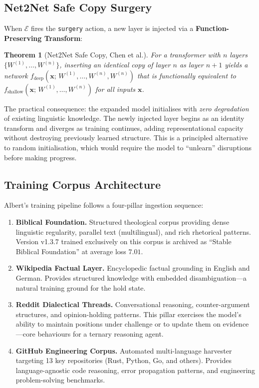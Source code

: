 \documentclass[journal,10pt,twocolumn]{IEEEtran}
\newtheorem{theorem}{Theorem}
\begin{document}
\subsection{Net2Net Safe Copy Surgery}
\label{subsec:net2net}

When $\mathcal{E}$ fires the \texttt{surgery} action, a new layer is injected
via a \textbf{Function-Preserving Transform}:

\begin{theorem}[Net2Net Safe Copy, Chen et al.]
For a transformer with $n$ layers $\{W^{(1)},\ldots,W^{(n)}\}$,
inserting an identical copy of layer $n$ as layer $n+1$ yields a network
$f_\text{deep}(\mathbf{x};\, W^{(1)},\ldots,W^{(n)},W^{(n)})$ that is
functionally equivalent to $f_\text{shallow}(\mathbf{x};\, W^{(1)},\ldots,W^{(n)})$
for all inputs $\mathbf{x}$.
\end{theorem}

\noindent The practical consequence: the expanded model initialises with
\emph{zero degradation} of existing linguistic knowledge. The newly injected
layer begins as an identity transform and diverges as training continues,
adding representational capacity without destroying previously learned
structure. This is a principled alternative to random initialisation, which
would require the model to ``unlearn'' disruptions before making progress.

\subsection{Training Corpus Architecture}

Albert's training pipeline follows a four-pillar ingestion sequence:

\begin{enumerate}
  \item \textbf{Biblical Foundation.} Structured theological corpus providing
        dense linguistic regularity, parallel text (multilingual), and rich
        rhetorical patterns. Version v1.3.7 trained exclusively on this corpus
        is archived as ``Stable Biblical Foundation'' at average loss $7.01$.
  \item \textbf{Wikipedia Factual Layer.} Encyclopedic factual grounding in
        English and German. Provides structured knowledge with embedded
        disambiguation---a natural training ground for the hold state.
  \item \textbf{Reddit Dialectical Threads.} Conversational reasoning,
        counter-argument structures, and opinion-holding patterns. This pillar
        exercises the model's ability to maintain positions under challenge or
        to update them on evidence---core behaviours for a ternary reasoning
        agent.
  \item \textbf{GitHub Engineering Corpus.} Automated multi-language
        harvester targeting 13 key repositories (Rust, Python, Go, and
        others). Provides language-agnostic code reasoning, error propagation
        patterns, and engineering problem-solving benchmarks.
\end{enumerate}
\end{document}
